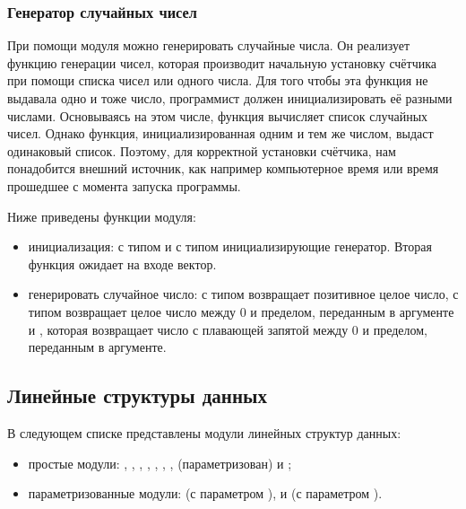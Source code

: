 \subsubsection{Генератор случайных чисел}
\label{subsubsec:generation_of_random_numbers}

При помощи модуля  можно генерировать случайные числа. Он 
реализует функцию генерации чисел, которая производит начальную установку 
счётчика при помощи списка чисел или одного числа. Для того чтобы эта функция 
не выдавала одно и тоже число, программист должен инициализировать её разными 
числами. Основываясь на этом числе, функция вычисляет список случайных чисел. 
Однако функция, инициализированная одним и тем же числом, выдаст одинаковый 
список. Поэтому, для корректной установки счётчика, нам понадобится внешний 
источник, как например компьютерное время или время прошедшее с момента запуска 
программы.

Ниже приведены функции модуля:

\begin{itemize}
	\item инициализация:  с типом  и
 с типом  инициализирующие генератор.
Вторая функция ожидает на входе вектор.

	\item генерировать случайное число:  с типом 
возвращает позитивное целое число,  с типом 
возвращает целое число между 0 и пределом, переданным в аргументе и 
, которая возвращает число с плавающей запятой между 0 и пределом, 
переданным в аргументе. 
\end{itemize}

\subsection{Линейные структуры данных}
\label{subsec:linear_data_structures}

В следующем списке представлены модули линейных структур данных:

\begin{itemize}
	\item простые модули: , , , 
, , , , 
(параметризован) и ;

	\item параметризованные модули:  (с параметром 
),  и  (с параметром ).
\end{itemize}

